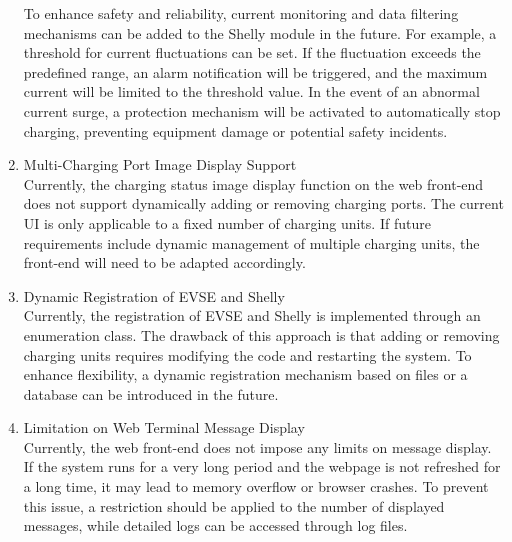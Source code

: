 \documentclass[
english,
ruledheaders=section,%
class=report,%
thesis={type=Report},%
accentcolor=9c,%
custommargins=true,%
marginpar=false,%
parskip=half-,%
fontsize=11pt,%
logofile={img/tuda_logo.pdf}, %
]{tudapub}
\begin{document}
\begin{enumerate}
            To enhance safety and reliability, current monitoring and data filtering mechanisms can be added to the Shelly module in the future.
            For example, a threshold for current fluctuations can be set. If the fluctuation exceeds the predefined range, an alarm notification will be triggered, and the maximum current will be limited to the threshold value.
            In the event of an abnormal current surge, a protection mechanism will be activated to automatically stop charging, preventing equipment damage or potential safety incidents.


            \item Multi-Charging Port Image Display Support\\
            Currently, the charging status image display function on the web front-end does not support dynamically adding or removing charging ports. The current UI is only applicable to a fixed number of charging units. If future requirements include dynamic management of multiple charging units, the front-end will need to be adapted accordingly.


            \item Dynamic Registration of EVSE and Shelly\\
            Currently, the registration of EVSE and Shelly is implemented through an enumeration class. The drawback of this approach is that adding or removing charging units requires modifying the code and restarting the system. To enhance flexibility, a dynamic registration mechanism based on files or a database can be introduced in the future.


            \item Limitation on Web Terminal Message Display\\
            Currently, the web front-end does not impose any limits on message display. If the system runs for a very long period and the webpage is not refreshed for a long time, it may lead to memory overflow or browser crashes. To prevent this issue, a restriction should be applied to the number of displayed messages, while detailed logs can be accessed through log files.



\end{enumerate}
\end{document}
